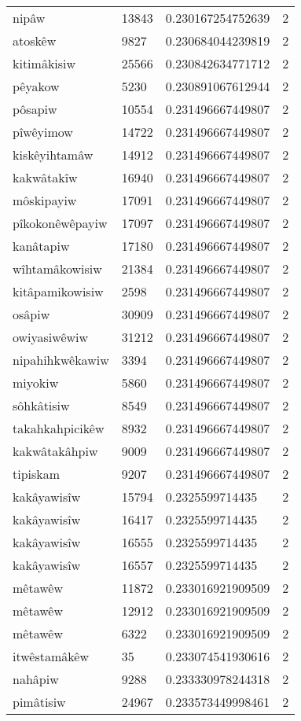 \begin{longtable}{llll}
nipâw & 13843 & 0.230167254752639 & 2 \\
atoskêw & 9827 & 0.230684044239819 & 2 \\
kitimâkisiw & 25566 & 0.230842634771712 & 2 \\
pêyakow & 5230 & 0.230891067612944 & 2 \\
pôsapiw & 10554 & 0.231496667449807 & 2 \\
pîwêyimow & 14722 & 0.231496667449807 & 2 \\
kiskêyihtamâw & 14912 & 0.231496667449807 & 2 \\
kakwâtakîw & 16940 & 0.231496667449807 & 2 \\
môskipayiw & 17091 & 0.231496667449807 & 2 \\
pîkokonêwêpayiw & 17097 & 0.231496667449807 & 2 \\
kanâtapiw & 17180 & 0.231496667449807 & 2 \\
wîhtamâkowisiw & 21384 & 0.231496667449807 & 2 \\
kitâpamikowisiw & 2598 & 0.231496667449807 & 2 \\
osâpiw & 30909 & 0.231496667449807 & 2 \\
owiyasiwêwiw & 31212 & 0.231496667449807 & 2 \\
nipahihkwêkawiw & 3394 & 0.231496667449807 & 2 \\
miyokiw & 5860 & 0.231496667449807 & 2 \\
sôhkâtisiw & 8549 & 0.231496667449807 & 2 \\
takahkahpicikêw & 8932 & 0.231496667449807 & 2 \\
kakwâtakâhpiw & 9009 & 0.231496667449807 & 2 \\
tipiskam & 9207 & 0.231496667449807 & 2 \\
kakâyawisîw & 15794 & 0.2325599714435 & 2 \\
kakâyawisîw & 16417 & 0.2325599714435 & 2 \\
kakâyawisîw & 16555 & 0.2325599714435 & 2 \\
kakâyawisîw & 16557 & 0.2325599714435 & 2 \\
mêtawêw & 11872 & 0.233016921909509 & 2 \\
mêtawêw & 12912 & 0.233016921909509 & 2 \\
mêtawêw & 6322 & 0.233016921909509 & 2 \\
itwêstamâkêw & 35 & 0.233074541930616 & 2 \\
nahâpiw & 9288 & 0.233330978244318 & 2 \\
pimâtisiw & 24967 & 0.233573449998461 & 2 \\

\end{longtable}
